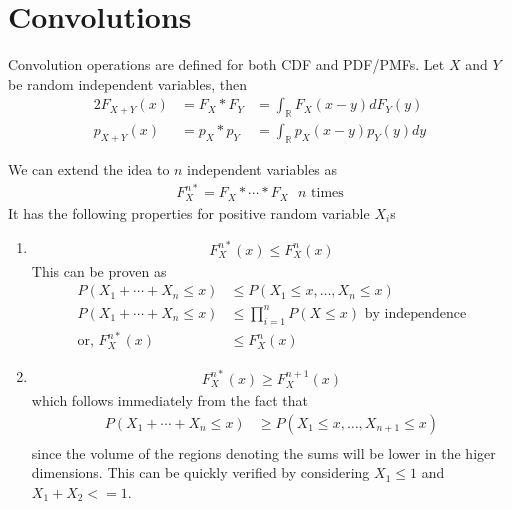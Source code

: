 \documentclass[../probability-notes.tex]{subfiles}
\begin{document}
\section{Convolutions} \label{convolution}
Convolution operations are defined for both CDF and PDF/PMFs. Let $X$ and $Y$ be random independent variables, then
\begin{alignat*}{2}
    F_{X+Y}(x) &= F_{X} * F_{Y} &= \int_{\mathbb{R}} F_{X}(x-y) dF_{Y}(y)\\
    p_{X+Y}(x) &= p_{X} * p_{Y} &= \int_{\mathbb{R}} p_{X}(x-y) p_{Y}(y) dy
\end{alignat*}

We can extend the idea to $n$ independent variables as
\begin{align*}
    F_{X}^{n*} = F_{X} * \cdots * F_{X} \text{ $n$ times}
\end{align*}
It has the following properties for positive random variable $X_{i}$s
\begin{enumerate}
    \item
    \begin{align*}
        F_{X}^{n*}(x) \leq F_{X}^{n}(x)
    \end{align*}
    This can be proven as
    \begin{align*}
        P(X_{1} + \cdots + X_{n} \leq x) &\leq P(X_{1} \leq x, \ldots, X_{n} \leq x)\\
        P(X_{1} + \cdots + X_{n} \leq x) &\leq \prod_{i=1}^{n} P(X \leq x) \text{ by independence}\\
        \text{or, } F_{X}^{n*}(x) &\leq F_{X}^{n}(x)
    \end{align*}

    \item
    \begin{align*}
        F_{X}^{n*}(x) \geq F_{X}^{n+1}(x)
    \end{align*}
    which follows immediately from the fact that
    \begin{align*}
        P(X_{1} + \cdots + X_{n} \leq x) &\geq P(X_{1} \leq x, \ldots, X_{n+1} \leq x)\\
    \end{align*}
    since the volume of the regions denoting the sums will be lower in the higer dimensions. This can be quickly verified by considering $X_{1} \leq 1$ and $X_{1} + X_{2} <= 1$.
\end{enumerate}
\end{document}
